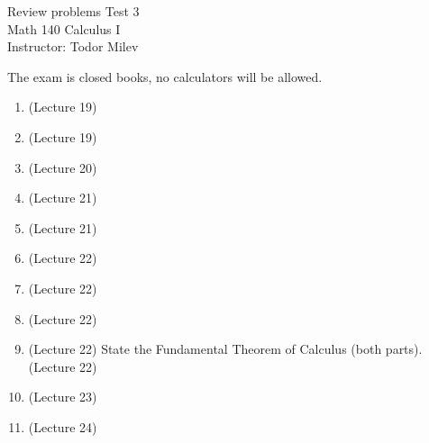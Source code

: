 \documentclass{article}
\begin{document}
\begin{center}
\Large
Review problems Test 3\\ Math 140 Calculus I \\ \normalsize Instructor: Todor Milev
\end{center}


\noindent The exam is closed books, no calculators will be allowed.

\begin{enumerate}
\item (Lecture 19) 
\item (Lecture 19) 
\item (Lecture 20) 
\item (Lecture 21) 
\item (Lecture 21) 
\item (Lecture 22) 
\item (Lecture 22) 

\item (Lecture 22) 
\item (Lecture 22) State the Fundamental Theorem of Calculus (both parts). (Lecture 22)

\item (Lecture 23) 

\item (Lecture 24)



\end{enumerate}











\end{document}
